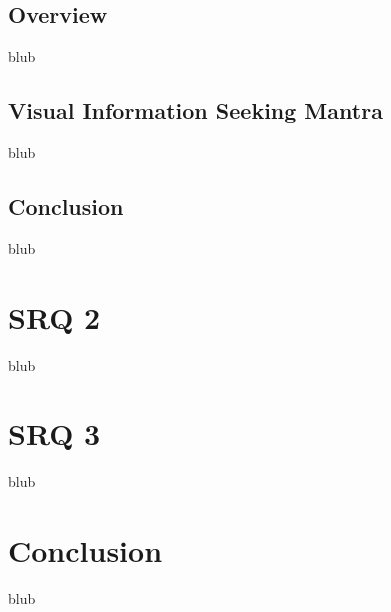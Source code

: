 
\subsection{Overview}

blub




\subsection{Visual Information Seeking Mantra}

blub




\subsection{Conclusion}

blub




\section{SRQ 2}

\label{SectionLiteratureReviewSRQ2}

blub




\section{SRQ 3}

\label{SectionLiteratureReviewSRQ3}

blub





\section{Conclusion}

\label{SectionLiteratureReviewConclusion}

blub

